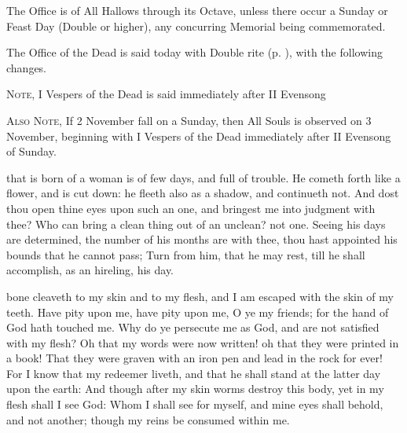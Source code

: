 \begin{rubric}
	The Office is of All Hallows through its Octave, unless there occur a Sunday or Feast Day (Double or higher), any concurring Memorial being commemorated.
\end{rubric}


\label{AllSouls}

\begin{rubric}
	The Office of the Dead is said today with Double rite (p. \pageref{Dead}), with the following changes.
\end{rubric}

\begin{rubric}
	\textsc{Note,} I Vespers of the Dead is said immediately after II Evensong 
\end{rubric}

\begin{rubric}
	\textsc{Also Note,} If 2 November fall on a Sunday, then All Souls is observed on 3 November, beginning with I Vespers of the Dead immediately after II Evensong of Sunday.
\end{rubric}

\mattins

 that is born of a woman is of few days, and full of trouble. He cometh forth like a flower, and is cut down: he fleeth also as a shadow, and continueth not. And dost thou open thine eyes upon such an one, and bringest me into judgment with thee? Who can bring a clean thing out of an unclean? not one. Seeing his days are determined, the number of his months are with thee, thou hast appointed his bounds that he cannot pass; Turn from him, that he may rest, till he shall accomplish, as an hireling, his day.

 bone cleaveth to my skin and to my flesh, and I am escaped with the skin of my teeth. Have pity upon me, have pity upon me, O ye my friends; for the hand of God hath touched me. Why do ye persecute me as God, and are not satisfied with my flesh? Oh that my words were now written! oh that they were printed in a book! That they were graven with an iron pen and lead in the rock for ever! For I know that my redeemer liveth, and that he shall stand at the latter day upon the earth: And though after my skin worms destroy this body, yet in my flesh shall I see God: Whom I shall see for myself, and mine eyes shall behold, and not another; though my reins be consumed within me.

